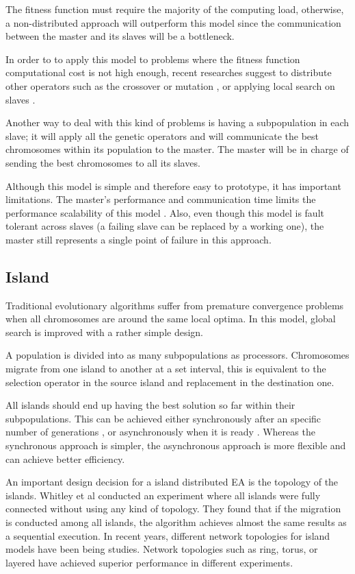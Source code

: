 The fitness function must require the majority of the computing load, otherwise, a non-distributed approach will outperform this model since the communication between the master and its slaves will be a bottleneck. 

In order to to apply this model to problems where the fitness function computational cost is not high enough, recent researches suggest to distribute other operators such as the crossover or mutation \cite{ismail}, or applying local search on slaves \cite{zhang2}. 

Another way to deal with this kind of problems is having a subpopulation in each slave; it will apply all the genetic operators and will communicate the best chromosomes within its population to the master. The master will be in charge of sending the best chromosomes to all its slaves.\cite{zhang1}

Although this model is simple and therefore easy to prototype, it has important limitations. The master's performance and communication time limits the performance scalability of this model \cite{erick}. Also, even though this model is fault tolerant across slaves (a failing slave can be replaced by a working one), the master still represents a single point of failure in this approach.

\subsection{Island}

Traditional evolutionary algorithms suffer from premature convergence problems when all chromosomes are around the same local optima. In this model, global search is improved with a rather simple design.

A population is divided into as many subpopulations as processors. Chromosomes migrate from one island to another at a set interval, this is equivalent to the selection operator in the source island and replacement in the destination one.

All islands should end up having the best solution so far within their subpopulations. This can be achieved either synchronously after an specific number of generations \cite{89}, or asynchronously when it is ready \cite{30}. Whereas the synchronous approach is simpler, the asynchronous approach is more flexible and can achieve better efficiency.

An important design decision for a island distributed EA is the topology of the islands. Whitley et al \cite{140} conducted an experiment where all islands were fully connected without using any kind of topology. They found that if the migration is conducted among all islands, the algorithm achieves almost the same results as a sequential execution. In recent years, different network topologies for island models have been being studies. Network topologies such as ring, torus, or layered have achieved superior performance in different experiments. \cite{62}

